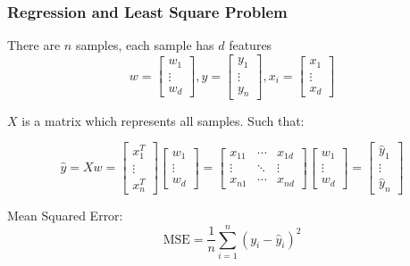 \documentclass[aspectratio=169, 10pt]{beamer}
\begin{document}
\begin{frame}
    \frametitle{Regression and Least Square Problem}
    
    There are $n$ samples, each sample has $d$ features
    \[
        w = \begin{bmatrix}
            w_1 \\ \vdots \\ w_d
        \end{bmatrix},
        y = \begin{bmatrix}
            y_1  \\ \vdots \\ y_n
        \end{bmatrix},
        x_i = \begin{bmatrix}
            x_1  \\ \vdots \\ x_d
        \end{bmatrix}
    \]
    
    $X$ is a matrix which represents all samples. Such that:

    \[
        \hat{y} = X w = 
        \begin{bmatrix}
            x^T_1 \\ \vdots \\ x^T_n
        \end{bmatrix} 
        \begin{bmatrix}
            w_1 \\ \vdots \\ w_d
        \end{bmatrix}
        = 
        \begin{bmatrix}
            x_{11} & \cdots & x_{1d} \\
            \vdots & \ddots & \vdots \\
            x_{n1} & \cdots & x_{nd}
        \end{bmatrix}
        \begin{bmatrix}
            w_1 \\ \vdots \\ w_d
        \end{bmatrix}
        = 
        \begin{bmatrix}
            \hat{y}_1 \\ \vdots \\ \hat{y}_n
        \end{bmatrix}
    \]

    Mean Squared Error:
    \[
        \text{MSE} = \frac{1}{n} \sum^{n}_{i=1}(y_i - \hat{y}_i)^2
    \]
\end{frame}
\end{document}
